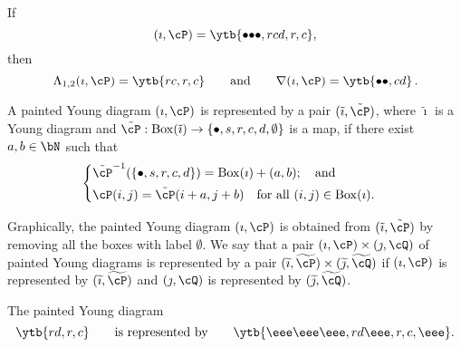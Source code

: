 \documentclass[ssunip]{subfiles}
\begin{document}
\begin{Example}
If 
\[
 (\imath, \cP)= \ytb{{\bullet}{\bullet}{\bullet},{r}{c}{d},{r},{c} },
\]
then 
\[
  \Lambda_{1,2}(\imath, \cP)= \ytb{{r}{c},{r},{c} }\qquad\textrm{and}\qquad \nabla(\imath, \cP)=
  \ytb{{\bullet}{\bullet},{c}{d} }\, .
\]
  \end{Example}
  
\begin{defn} A painted Young diagram $(\imath, \cP)$ is represented by    a pair $(\tilde \imath, \tilde \cP)$, where  $\tilde \imath$ is a Young diagram and $\tilde \cP: \mathrm{Box}(\tilde \imath)\rightarrow \{\bullet, s,r,c,d, \emptyset \}$ is a map, if there exist $a,b\in \bN$ such that
      \[
      \begin{cases} 
    \tilde \cP^{-1}(\{\bullet, s, r,c,d\})=\mathrm{Box}(\imath)+(a,b); \quad \textrm{and} &\hbox{} \smallskip\\
  \cP(i,j)=\tilde \cP(i+a,j+b) \quad \textrm{for all  $(i,j)\in \mathrm{Box}(\imath)$.} &\hbox{} \\
  \end{cases} 
          \]
          \end{defn}
  Graphically, the painted Young diagram $(\imath, \cP)$   is obtained from $(\tilde \imath, \tilde \cP)$ by removing all the boxes with label $\emptyset$.  We say that a pair  $(\imath, \cP)\times (\jmath, \cQ)$ of painted Young diagrams is represented by a pair  $(\widetilde \imath, \widetilde \cP)\times (\widetilde \jmath, \widetilde \cQ)$ if $( \imath, \cP)$ is represented by $(\widetilde \imath, \widetilde \cP)$ and $( \jmath, \cQ )$ is represented by $(\widetilde \jmath, \widetilde \cQ )$. 
  
   \begin{Example}
The painted Young diagram
\[
  \ytb{{r}{d},{r},{c} }
\qquad \textrm{is represented by}\qquad 
  \ytb{{\eee}{\eee}{\eee},{r}{d}{\eee},{r},{c},{\eee} }.
\]

  \end{Example}
  
 



%
\end{document}
